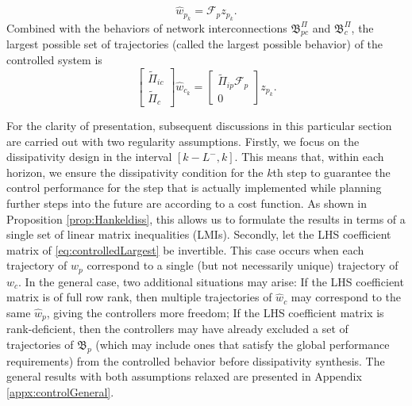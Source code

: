 \documentclass[11pt,print,draftcls,onecolumn,romanappendices]{ieeecolor}
\newcommand{\revise}[1]{{\color{black} #1}}
\newcommand{\B}{\mathfrak{B}}
\newcommand{\F}{\mathcal{F}}
\begin{document}
\revise{\begin{equation}\label{eq:systemManifest}
    \hat{w}_{p_k}=\F_pz_{p_k}.
\end{equation}
\revise{Combined with the behaviors of network interconnections $\B_{pc}^\Pi$ and $\B_c^\Pi$, the largest possible set of trajectories (called the largest possible behavior)} of the controlled system is
\begin{equation}\label{eq:controlledLargest}
    \begin{bmatrix}
        \widetilde{\Pi}_{ic}\\ \widetilde{\Pi}_c
    \end{bmatrix}\hat{w}_{c_k}=\begin{bmatrix}
        \widetilde{\Pi}_{ip}\F_p\\ 0
    \end{bmatrix}z_{p_k}.
\end{equation}

For the clarity of presentation, subsequent discussions in this particular section are carried out with two regularity assumptions. Firstly, we focus on the dissipativity design in the interval $[k-L^-,k]$. This means that, within each horizon, we ensure the dissipativity condition for the $k$th step to guarantee the control performance for the step that is actually implemented while planning further steps into the future are  according to a cost function. As shown in Proposition \ref{prop:Hankeldiss}, this allows us to formulate the results in terms of a single set of linear matrix inequalities (LMIs). Secondly, let the LHS coefficient matrix of \eqref{eq:controlledLargest} be invertible. This case occurs when each trajectory of $w_p$ correspond to a single (but not necessarily unique) trajectory of $w_c$. In the general case, two additional situations may arise: If the LHS coefficient matrix is of full row rank, then multiple trajectories of $\hat{w}_c$ may correspond to the same $\hat{w}_p$, giving the controllers more freedom; If the LHS coefficient matrix is rank-deficient, then the controllers may have already excluded a set of trajectories of $\B_p$ (which may include ones that satisfy the global performance requirements) from the controlled behavior before dissipativity synthesis. The general results with both assumptions relaxed are presented in Appendix \ref{appx:controlGeneral}.

}
\end{document}
